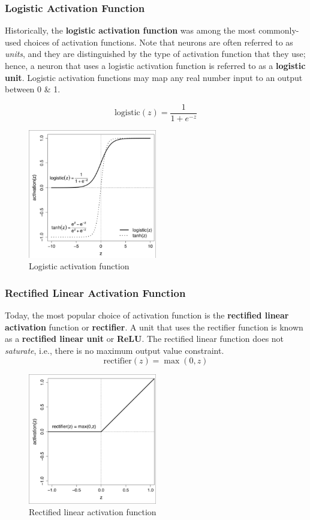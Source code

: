 \documentclass[a4paper,11pt]{article}
\begin{document}
\subsubsection{Logistic Activation Function}
Historically, the \textbf{logistic activation function} was among the most commonly-used choices of activation functions.
Note that neurons are often referred to as \textit{units}, and they are distinguished by the type of activation function that they use;
hence, a neuron that uses a logistic activation function is referred to as a \textbf{logistic unit}.
Logistic activation functions may map any real number input to an output between 0 \& 1.

\[
    \text{logistic}(z) = \frac{1}{1+e^{-z}}
\]

\begin{figure}[H]
    \centering
    \includegraphics[width=0.5\textwidth]{images/logisticactivationfunction.png}
    \caption{ Logistic activation function }
\end{figure}

\subsubsection{Rectified Linear Activation Function}
Today, the most popular choice of activation function is the \textbf{rectified linear activation} function or \textbf{rectifier}.
A unit that uses the rectifier function is known as a \textbf{rectified linear unit} or \textbf{ReLU}.
The rectified linear function does not \textit{saturate}, i.e., there is no maximum output value constraint.
\[
    \text{rectifier}(z) = \max(0,z)
\]

\begin{figure}[H]
    \centering
    \includegraphics[width=0.5\textwidth]{images/rectifiedlinearactivationfunction.png}
    \caption{ Rectified linear activation function }
\end{figure}
\end{document}

